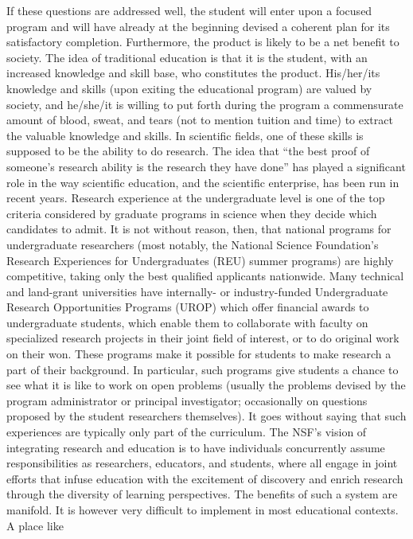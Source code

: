 If these questions are addressed well, the student will enter upon a
focused program and will have already at the beginning devised a
coherent plan for its satisfactory completion. Furthermore, the product
is likely to be a net benefit to society. The idea of traditional
education is that it is the student, with an increased knowledge and
skill base, who constitutes the product. His/her/its knowledge and
skills (upon exiting the educational program) are valued by society, and
he/she/it is willing to put forth during the program a commensurate
amount of blood, sweat, and tears (not to mention tuition and time) to
extract the valuable knowledge and skills. In scientific fields, one of
these skills is supposed to be the ability to do research. The idea that
``the best proof of someone's research ability is the research they have
done'' has played a significant role in the way scientific education,
and the scientific enterprise, has been run in recent years. Research
experience at the undergraduate level is one of the top criteria
considered by graduate programs in science when they decide which
candidates to admit. It is not without reason, then, that national
programs for undergraduate researchers (most notably, the National
Science Foundation's Research Experiences for Undergraduates (REU)
summer programs) are highly competitive, taking only the best qualified
applicants nationwide. Many technical and land-grant universities have
internally- or industry-funded Undergraduate Research Opportunities
Programs (UROP) which offer financial awards to undergraduate students,
which enable them to collaborate with faculty on specialized research
projects in their joint field of interest, or to do original work on
their won. These programs make it possible for students to make research
a part of their background. In particular, such programs give students a
chance to see what it is like to work on open problems (usually the
problems devised by the program administrator or principal investigator;
occasionally on questions proposed by the student researchers
themselves). It goes without saying that such experiences are typically
only part of the curriculum. The NSF's vision of integrating research
and education is to have individuals concurrently assume
responsibilities as researchers, educators, and students, where all
engage in joint efforts that infuse education with the excitement of
discovery and enrich research through the diversity of learning
perspectives. The benefits of such a system are manifold. It is however
very difficult to implement in most educational contexts. A place like
